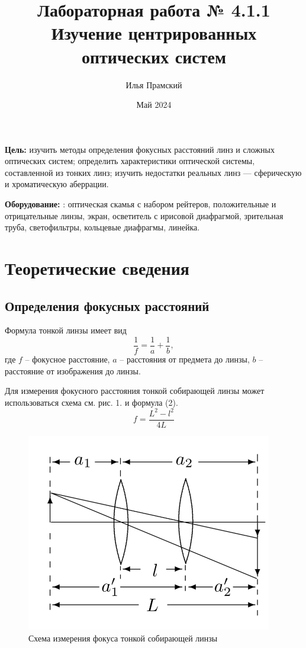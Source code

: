 \documentclass[a4paper,12pt]{article}
\title{Лабораторная работа № 4.1.1\\Изучение центрированных оптических систем}
\author{Илья Прамский}
\date{Май 2024}
\begin{document}
\maketitle
\newpage

\textbf{Цель:} изучить методы определения фокусных расстояний
линз и сложных оптических систем; определить характеристики оптической системы, составленной из тонких линз; изучить недостатки
реальных линз — сферическую и хроматическую аберрации.

\textbf{Оборудование:} : оптическая скамья с набором рейтеров, положительные и отрицательные линзы, экран, осветитель с ирисовой
диафрагмой, зрительная труба, светофильтры, кольцевые диафрагмы, линейка.

\section{Теоретические сведения}
\subsection*{Определения фокусных расстояний}
Формула тонкой линзы имеет вид
\begin{equation}
    \frac{1}{f} = \frac{1}{a} + \frac{1}{b},
\end{equation}
\noindent
где $f$ -- фокусное расстояние, $a$ -- расстояния от предмета до линзы, $b$ -- расстояние от изображения до линзы.

\noindent
Для измерения фокусного расстояния тонкой собирающей линзы может использоваться схема см. рис. 1. и формула (2).
\begin{equation}
    f = \frac{L^2 - l^2}{4L}
\end{equation}

\begin{figure}[H]
    \centering
    \includegraphics[scale=0.7]{focuses.png}
    \caption{Схема измерения фокуса тонкой собирающей линзы}
\end{figure}
\end{document}
